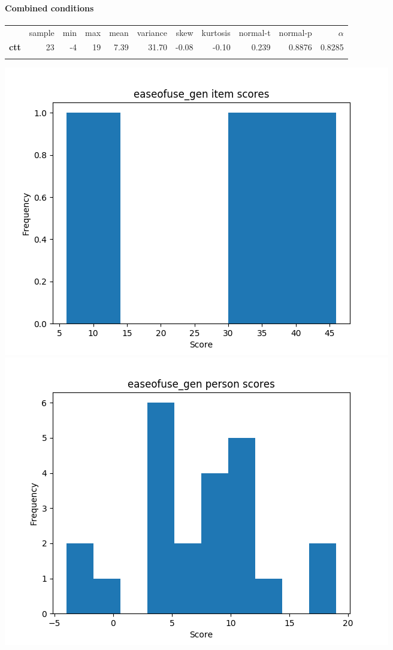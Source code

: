 \documentclass[]{article}
\begin{document}
\FloatBarrier
\paragraph{Combined conditions}\label{combined-conditions-4}

\begin{longtable}[c]{@{}lrrrrrrrrrr@{}}
\toprule\addlinespace
& sample & min & max & mean & variance & skew & kurtosis & normal-t &
normal-p & $\alpha$
\\\addlinespace
\midrule\endhead
\textbf{ctt} & 23 & -4 & 19 & 7.39 & 31.70 & -0.08 & -0.10 & 0.239 &
0.8876 & 0.8285
\\\addlinespace
\bottomrule
\end{longtable}

\includegraphics{easeofuse_gen_diff.png}
\includegraphics{easeofuse_gen_abil.png}
\end{document}
